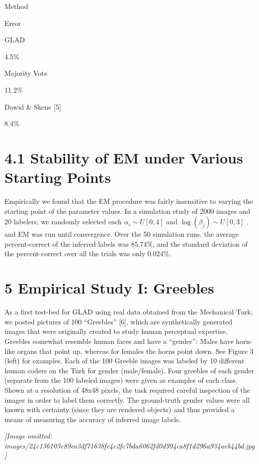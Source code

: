 \documentclass[
]{article}
\begin{document}
Method

Error

GLAD

4.5\%

Majority Vote

11.2\%

Dawid \& Skene {[}5{]}

8.4\%

\section{4.1 Stability of EM under Various Starting
Points}\label{stability-of-em-under-various-starting-points}

Empirically we found that the EM procedure was fairly insensitive to
varying the starting point of the parameter values. In a simulation
study of 2000 images and 20 labelers, we randomly selected each
\(\alpha_{i} \sim U[0,4]\) and \(\log(\beta_{j}) \sim U[0,3]\) , and EM
was run until convergence. Over the 50 simulation runs, the average
percent-correct of the inferred labels was 85.74\%, and the standard
deviation of the percent-correct over all the trials was only 0.024\%.

\section{5 Empirical Study I:
Greebles}\label{empirical-study-i-greebles}

As a first test-bed for GLAD using real data obtained from the
Mechanical Turk, we posted pictures of 100 ``Greebles'' {[}6{]}, which
are synthetically generated images that were originally created to study
human perceptual expertise. Greebles somewhat resemble human faces and
have a ``gender'': Males have horn-like organs that point up, whereas
for females the horns point down. See Figure 3 (left) for examples. Each
of the 100 Greeble images was labeled by 10 different human coders on
the Turk for gender (male/female). Four greebles of each gender
(separate from the 100 labeled images) were given as examples of each
class. Shown at a resolution of 48x48 pixels, the task required careful
inspection of the images in order to label them correctly. The
ground-truth gender values were all known with certainty (since they are
rendered objects) and thus provided a means of measuring the accuracy of
inferred image labels.

\textit{[Image omitted: images/24c136103c89ea3df71638fe4c2fc7bda6062fd0d994ca8f1d296a934aeb44bd.jpg]}
\end{document}
